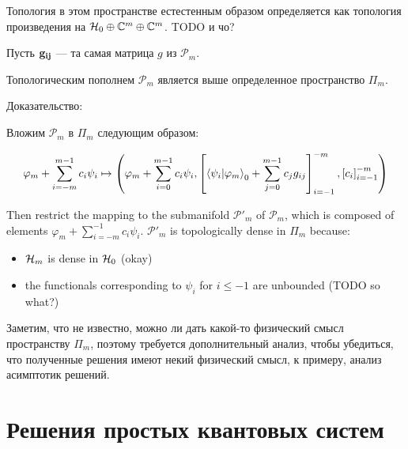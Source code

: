 Топология в этом пространстве естестенным образом определяется как топология произведения на $\mathcal{H}_{0} \oplus \mathbb{C}^m \oplus \mathbb{C}^m$. TODO и чо?

Пусть $\vb{g_{ij}}$ — та самая матрица $g$ из $\mathcal{P}_m$. 

\begin{theorem}
Топологическим пополнем $\mathcal{P}_m$ является выше определенное пространство $\Pi_m$.
\end{theorem}

Доказательство:

Вложим $\mathcal{P}_m$ в $\Pi_m$ следующим образом:

\[
\varphi_m + \sum\limits_{i = -m}^{m - 1} c_i \psi_i \mapsto
\left(
\varphi_m + \sum\limits_{i = 0}^{m - 1} c_i \psi_i,
\left[ \ip{\psi_i}{\varphi_m}_0 + \sum\limits_{j = 0}^{m - 1} c_j g_{ij} \right]_{i = -1}^{-m},
\left[ c_i \right]_{i = -1}^{-m}
\right)
\]

Then restrict the mapping to the submanifold $\mathcal{P}'_m$ of $\mathcal{P}_m$, which is composed of elements $\varphi_m + \sum\limits_{i = - m}^{-1} c_i \psi_i$. $\mathcal{P}'_m$ is topologically dense in $\Pi_m$ because:

\begin{itemize}
\item $\mathcal{H}_{m}$ is dense in $\mathcal{H}_{0}$ (okay)
\item the functionals corresponding to $\psi_i$ for $i \le -1$ are unbounded (TODO so what?)
\end{itemize}

Заметим, что не известно, можно ли дать какой-то физический смысл пространству $\Pi_m$, поэтому требуется дополнительный анализ, чтобы убедиться, что полученные решения имеют некий физический смысл, к примеру, анализ асимптотик решений.



\section{Решения простых квантовых систем}
